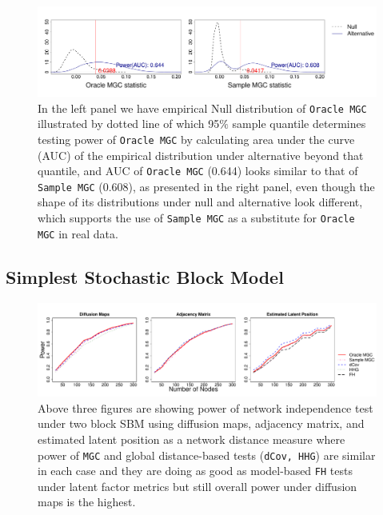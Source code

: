 \documentclass[12pt]{article}
\begin{document}
\begin{figure}[H]
	\centering
	\includegraphics[width=6in]{../Figure/density.pdf}
	\caption{In the left panel we have empirical Null distribution of \texttt{Oracle MGC} illustrated by dotted line of which 95$\%$ sample quantile determines testing power of \texttt{Oracle MGC} by calculating area under the curve (AUC) of the empirical distribution under alternative beyond that quantile, and AUC of \texttt{Oracle MGC} (0.644) looks similar to that of \texttt{Sample MGC} (0.608), as presented in the right panel, even though the shape of its distributions under null and alternative look different, which supports the use of \texttt{Sample MGC} as a substitute for \texttt{Oracle MGC} in real data.}
	\label{fig:density}
\end{figure}	
 
 \newpage
\subsection*{Simplest Stochastic Block Model}
 
\begin{figure}[h]
	\centering
	\includegraphics[width=6in]{../Figure/twoSBM.pdf}
	\caption{Above three figures are showing power of network independence test under two block SBM using diffusion maps, adjacency matrix, and estimated latent position as a network distance measure where power of \texttt{MGC} and global distance-based tests (\texttt{dCov, HHG}) are similar in each case and they are doing as good as model-based \texttt{FH} tests under latent factor metrics but still overall power under diffusion maps is the highest.}
	\label{fig:twoSBM}

\end{figure}
\end{document}
